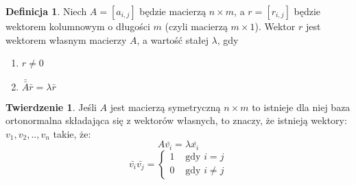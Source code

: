 \documentclass[a4paper,12pt]{article}
\theoremstyle{definition}%
\newtheorem{theorem}{Twierdzenie}%
\theoremstyle{definition}
\newtheorem{definition}{Definicja}%
\theoremstyle{problem}
\begin{document}
\begin{definition}
Niech $A=[a_{i,j}]$ będzie macierzą $n\times m$, a $r=[r_{i,j}]$ będzie wektorem kolumnowym o długości $m$ (czyli macierzą $m\times 1$). Wektor $r$ jest wektorem własnym macierzy $A$, a wartość stałej $\lambda $, gdy
\begin{enumerate}
\item $r\neq 0$
\item $ \bar{\bar{A}}\bar{r}=\lambda \bar{r}$
\end{enumerate}
\end{definition}

\begin{theorem}
Jeśli $A$ jest macierzą symetryczną $n\times m$ to istnieje dla niej baza ortonormalna składająca się z wektorów własnych, to znaczy, że istnieją wektory: $v_1,v_2,..,v_n$ takie, że:
$$A\bar{v_i}=\lambda \bar{x_i}$$
$$\bar{v_i}\bar{v_j}=\left\{\begin{matrix}
1 &\text{ gdy }i=j\\
0&\text{ gdy } i\neq j 
\end{matrix}\right.$$
\end{theorem}
\end{document}
